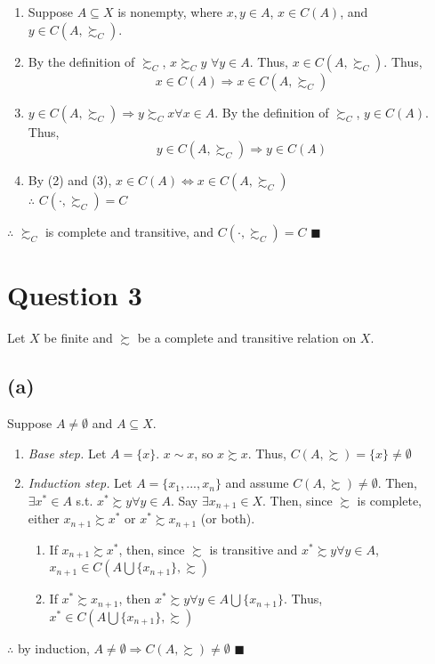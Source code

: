 \documentclass{article}
\newcommand{\union}{\bigcup}
\begin{document}
\begin{enumerate}
	\item Suppose $A\subseteq X$ is nonempty, where $x,y\in A$, $x\in C(A)$, and $y\in C(A,\succsim_C)$.
	
	\item By the definition of $\succsim_C$, $x\succsim_C y$ $\forall y\in A$. Thus, $x\in C\left(A,\succsim_C\right)$.  Thus, 
		\[
			x\in C(A)\Rightarrow x\in C\left(A,\succsim_C\right)
		\]
	
	\item $y\in C\left(A,\succsim_C\right)\Rightarrow y\succsim_C x \forall x\in A$.  By the definition of $\succsim_C$, $y\in C(A)$. Thus, 
		\[
			y\in C\left(A,\succsim_C\right)\Rightarrow y\in C(A)
		\]
	
	\item By (2) and (3), $x\in C(A)\iff x\in C\left(A,\succsim_C\right)$
	\medskip \\
	$\therefore$  $C\left(\cdot,\succsim_C\right) = C$
	
\end{enumerate}
$\therefore$ $\succsim_C$ is complete and transitive, and $C\left(\cdot,\succsim_C\right) = C$ $\blacksquare$


\section*{Question 3}
Let $X$ be finite and $\succsim$ be a complete and transitive relation on $X$.

\subsection*{(a)}
Suppose $A\neq\emptyset$ and $A\subseteq X$.
\begin{enumerate}
	\item \textit{Base step.} Let $A=\{x\}$. $x\sim x$, so $x\succsim x$. Thus, $C(A,\succsim)=\{x\}\neq\emptyset$
	
	\item \textit{Induction step.} Let $A=\{x_1,...,x_n\}$ and assume $C(A,\succsim)\neq\emptyset$. Then, $\exists x^*\in A$ s.t. $x^*\succsim y\forall y\in A$. Say $\exists x_{n+1}\in X$. Then, since $\succsim$ is complete, either $x_{n+1}\succsim x^*$ or $x^*\succsim x_{n+1}$ (or both).
		\begin{enumerate}
			\item If $x_{n+1}\succsim x^*$, then, since $\succsim$ is transitive and $x^*\succsim y\forall y\in A$, ${x_{n+1}\in C(A\union\{x_{n+1}\},\succsim)}$
			\item If $x^*\succsim x_{n+1}$, then $x^*\succsim y\forall y\in A\union\{x_{n+1}\}$. Thus, ${x^*\in C(A\union\{x_{n+1}\},\succsim)}$
		\end{enumerate}
\end{enumerate}
$\therefore$ by induction, $A\neq\emptyset\Rightarrow C(A,\succsim)\neq\emptyset$ $\blacksquare$
\end{document}
